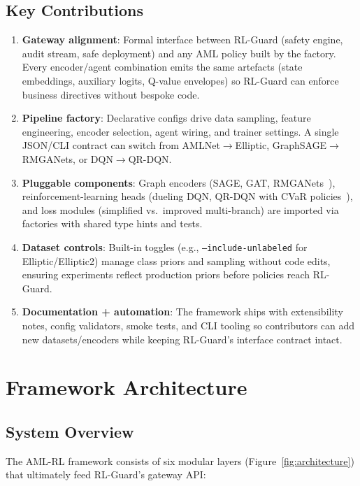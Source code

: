 \documentclass[11pt,a4paper]{article}
\begin{document}
\subsection{Key Contributions}

\begin{enumerate}
    \item \textbf{Gateway alignment}: Formal interface between RL-Guard (safety engine, audit stream, safe deployment) and any AML policy built by the factory. Every encoder/agent combination emits the same artefacts (state embeddings, auxiliary logits, Q-value envelopes) so RL-Guard can enforce business directives without bespoke code.
    \item \textbf{Pipeline factory}: Declarative configs drive data sampling, feature engineering, encoder selection, agent wiring, and trainer settings. A single JSON/CLI contract can switch from AMLNet$\rightarrow$Elliptic, GraphSAGE$\rightarrow$RMGANets, or DQN$\rightarrow$QR-DQN.
    \item \textbf{Pluggable components}: Graph encoders (SAGE, GAT, RMGANets~\cite{rmganets2024}), reinforcement-learning heads (dueling DQN, QR-DQN with CVaR policies~\cite{dabney2018distributional}), and loss modules (simplified vs.\ improved multi-branch) are imported via factories with shared type hints and tests.
    \item \textbf{Dataset controls}: Built-in toggles (e.g., \texttt{--include-unlabeled} for Elliptic/Elliptic2) manage class priors and sampling without code edits, ensuring experiments reflect production priors before policies reach RL-Guard.
    \item \textbf{Documentation + automation}: The framework ships with extensibility notes, config validators, smoke tests, and CLI tooling so contributors can add new datasets/encoders while keeping RL-Guard's interface contract intact.
\end{enumerate}

\section{Framework Architecture}

\subsection{System Overview}

The AML-RL framework consists of six modular layers (Figure~\ref{fig:architecture}) that ultimately feed RL-Guard's gateway API:
\end{document}
